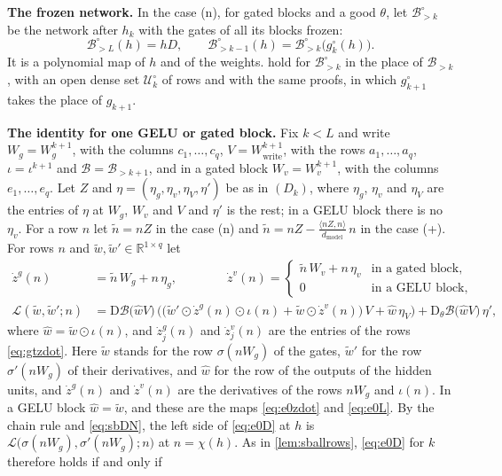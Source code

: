\documentclass[10pt]{article}
\theoremstyle{definition}
\theoremstyle{remark}
\newcommand{\R}{\mathbb{R}}
\newcommand{\Wwrite}{W_{\mathrm{write}}}
\newcommand{\dm}{d_{\mathrm{model}}}
\newcommand{\Der}{\mathrm{D}}
\newcommand{\para}[1]{\smallskip\noindent\textbf{#1}\hspace{0.5em}}
\begin{document}
\para{The frozen network.} In the case (n), for gated blocks and a good $\theta$, let $\mathcal B^\circ_{>k}$ be the network after $h_k$ with the gates of all its blocks frozen:
\[
\mathcal B^\circ_{>L}(h) = hD, \qquad \mathcal B^\circ_{>k-1}(h) = \mathcal B^\circ_{>k}\big(g^\circ_k(h)\big).
\]
It is a polynomial map of $h$ and of the weights.  hold for $\mathcal B^\circ_{>k}$ in the place of $\mathcal B_{>k}$, with an open dense set $\mathcal U^\circ_k$ of rows and with the same proofs, in which $g^\circ_{k+1}$ takes the place of $g_{k+1}$.

\para{The identity for one GELU or gated block.} Fix $k < L$ and write $W_g = W_g^{k+1}$, with the columns $c_1, \dots, c_q$, $V = \Wwrite^{k+1}$, with the rows $a_1, \dots, a_q$, $\iota = \iota^{k+1}$ and $\mathcal B = \mathcal B_{>k+1}$, and in a gated block $W_v = W_v^{k+1}$, with the columns $e_1, \dots, e_q$. Let $Z$ and $\eta = (\eta_g, \eta_v, \eta_V, \eta')$ be as in $(D_k)$, where $\eta_g$, $\eta_v$ and $\eta_V$ are the entries of $\eta$ at $W_g$, $W_v$ and $V$ and $\eta'$ is the rest; in a GELU block there is no $\eta_v$. For a row $n$ let $\tilde n = nZ$ in the case (n) and $\tilde n = nZ - \frac{\langle nZ, n\rangle}{\dm}\,n$ in the case (+). For rows $n$ and $\tilde w, \tilde w' \in \R^{1\times q}$ let
\begin{align}
\dot z^g(n) &= \tilde n\,W_g + n\,\eta_g, \qquad\qquad \dot z^v(n) = \begin{cases} \tilde n\,W_v + n\,\eta_v & \text{in a gated block,}\\ 0 & \text{in a GELU block,}\end{cases} \label{eq:gtzdot}\\[3pt]
\mathcal L(\tilde w, \tilde w'; n) &= \Der\mathcal B\big(\hat wV\big)\,\Big(\big(\tilde w'\odot\dot z^g(n)\odot\iota(n) + \tilde w\odot\dot z^v(n)\big)\,V + \hat w\,\eta_V\Big) + \Der_\theta\mathcal B\big(\hat wV\big)\,\eta' , \label{eq:gtL}
\end{align}
where $\hat w = \tilde w\odot\iota(n)$, and $\dot z^g_j(n)$ and $\dot z^v_j(n)$ are the entries of the rows \eqref{eq:gtzdot}. Here $\tilde w$ stands for the row $\sigma(nW_g)$ of the gates, $\tilde w'$ for the row $\sigma'(nW_g)$ of their derivatives, and $\hat w$ for the row of the outputs of the hidden units, and $\dot z^g(n)$ and $\dot z^v(n)$ are the derivatives of the rows $nW_g$ and $\iota(n)$. In a GELU block $\hat w = \tilde w$, and these are the maps \eqref{eq:e0zdot} and \eqref{eq:e0L}. By the chain rule and \eqref{eq:sbDN}, the left side of \eqref{eq:e0D} at $h$ is $\mathcal L\big(\sigma(nW_g), \sigma'(nW_g); n\big)$ at $n = \chi(h)$. As in \cref{lem:sballrows}, \eqref{eq:e0D} for $k$ therefore holds if and only if
\end{document}
